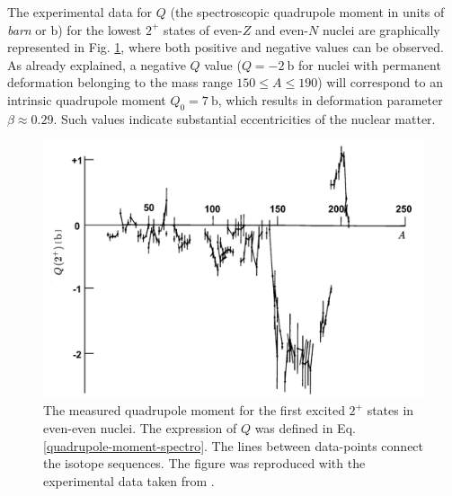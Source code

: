 The experimental data for $Q$ (the spectroscopic quadrupole moment in units of \emph{barn} or $\text{b}$) for the lowest $2^+$ states of even-$Z$ and even-$N$ nuclei are graphically represented in Fig. \ref{experimental-quadrupole-2Plus-states}, where both positive and negative values can be observed. As already explained, a negative $Q$ value ($Q=-2\ \text{b}$ for nuclei with permanent deformation belonging to the mass range $150\leq A \leq 190$) will correspond to an intrinsic quadrupole moment $Q_0=7\ \text{b}$, which results in deformation parameter $\beta\approx 0.29$. Such values indicate substantial eccentricities of the nuclear matter.
\begin{figure}
    \centering
    \includegraphics[scale=0.25]{Chapters/Figures/2Plus_spectroscopicQ.pdf}
    \caption{The measured quadrupole moment for the first excited $2^+$ states in even-even nuclei. The expression of $Q$ was defined in Eq. \ref{quadrupole-moment-spectro}. The lines between data-points connect the isotope sequences. The figure was reproduced with the experimental data taken from \cite{krane1991introductory}.}
    \label{experimental-quadrupole-2Plus-states}
\end{figure}
